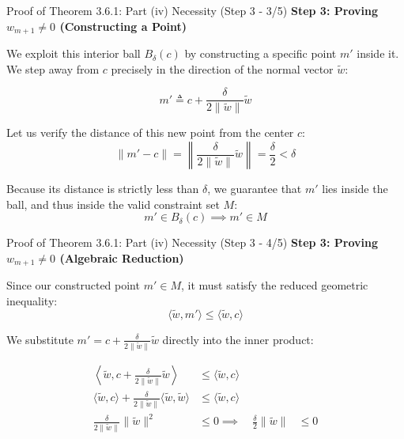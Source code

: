 \documentclass[10pt, aspectratio=169, xcolor=dvipsnames]{beamer}
\newcommand{\lead}[1]{{\color{UniBlue}\bfseries #1}}
\begin{document}
\begin{frame}{Proof of Theorem 3.6.1: Part (iv) Necessity (Step 3 - 3/5)}
    \lead{Step 3: Proving $w_{m+1} \neq 0$ (Constructing a Point)}\\
    \vspace{0.4cm}
    
    We exploit this interior ball $B_\delta(c)$ by constructing a specific point $m'$ inside it. We step away from $c$ precisely in the direction of the normal vector $\tilde{w}$:
    
    \vspace{0.2cm}
    \[ m' \triangleq c + \frac{\delta}{2 \|\tilde{w}\|} \tilde{w} \]
    
    \vspace{0.2cm}
    Let us verify the distance of this new point from the center $c$:
    \[ \|m' - c\| = \left\| \frac{\delta}{2 \|\tilde{w}\|} \tilde{w} \right\| = \frac{\delta}{2} < \delta \]
    
    \vspace{0.2cm}
    Because its distance is strictly less than $\delta$, we guarantee that $m'$ lies inside the ball, and thus inside the valid constraint set $M$:
    \[ m' \in B_\delta(c) \implies m' \in M \]
\end{frame}

\begin{frame}{Proof of Theorem 3.6.1: Part (iv) Necessity (Step 3 - 4/5)}
    \lead{Step 3: Proving $w_{m+1} \neq 0$ (Algebraic Reduction)}\\
    \vspace{0.4cm}
    
    Since our constructed point $m' \in M$, it must satisfy the reduced geometric inequality:
    \[ \langle \tilde{w}, m' \rangle \le \langle \tilde{w}, c \rangle \]
    
    \vspace{0.4cm}
    We substitute $m' = c + \frac{\delta}{2 \|\tilde{w}\|} \tilde{w}$ directly into the inner product:
    
    \vspace{0.2cm}
    \[
    \begin{aligned}
        \left\langle \tilde{w}, c + \frac{\delta}{2 \|\tilde{w}\|} \tilde{w} \right\rangle &\le \langle \tilde{w}, c \rangle \\[6pt]
        \langle \tilde{w}, c \rangle + \frac{\delta}{2 \|\tilde{w}\|} \langle \tilde{w}, \tilde{w} \rangle &\le \langle \tilde{w}, c \rangle \\[6pt]
        \frac{\delta}{2 \|\tilde{w}\|} \|\tilde{w}\|^2 &\le 0 \implies \quad \frac{\delta}{2} \|\tilde{w}\| &\le 0 \\[6pt]
        
    \end{aligned}
    \]
\end{frame}
\end{document}
